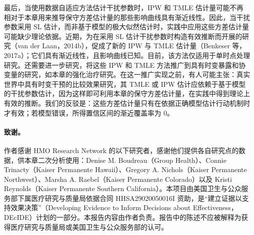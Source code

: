 最后，当使用数据自适应方法估计干扰参数时，IPW 和 TMLE 估计量可能不再相对于本章用来推导保守方差估计量的那些影响曲线具有渐近线性。因此，当干扰参数采用 SL 估计，而非基于模型的极大似然估计时，实践中应用这些方差估计量可能缺少理论依据。近期，为在采用 SL 估计干扰参数时构造有效推断而开展的研究（van der Laan，2014b），促成了新的 IPW 与 TMLE 估计量（Benkeser 等，2017a）；它们具有渐近线性，且影响曲线已知。目前，该方法仅适用于单时点处理研究。还需要进一步研究，将这些 IPW 和 TMLE 方法推广到具有时变暴露和协变量的研究，如本章的强化治疗研究。在这一推广实现之前，有人可能主张：真实世界中具有时变干预的比较效果研究，其 TMLE 或 IPW 估计应依赖于基于模型的干扰参数估计，因为这样即可利用本章的保守方差估计量，在实践中得到理论上有效的推断。我们的反驳是：这些方差估计量只有在依据正确模型估计行动机制时才有效；若模型错误，所得置信区间的渐近覆盖率为 0。

\paragraph{致谢。}
作者感谢 HMO Research Network 的以下研究者，感谢他们提供各自研究点的数据，供本章二次分析使用：Denise M. Boudreau（Group Health）、Connie Trinacty（Kaiser Permanente Hawaii）、Gregory A. Nichols（Kaiser Permanente Northwest）、Marsha A. Raebel（Kaiser Permanente Colorado）以及 Kristi Reynolds（Kaiser Permanente Southern California）。本项目由美国卫生与公众服务部下属医疗研究与质量局依据合同 HHSA29020050016I 资助，是“建立证据以支持效果决策”（Developing Evidence to Inform Decisions about Effectiveness，DEcIDE）计划的一部分。本报告内容由作者负责。报告中的陈述不应被解释为获得医疗研究与质量局或美国卫生与公众服务部的认可。
\FloatBarrier
